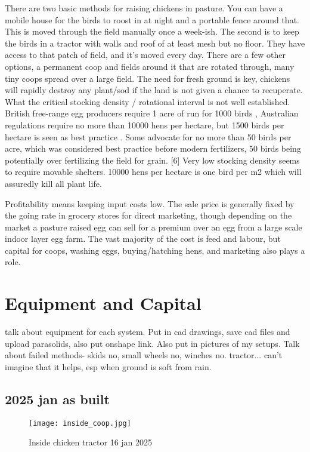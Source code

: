 \documentclass [11pt]{article}
\begin{document}
There are two basic methods for raising chickens in pasture.\cite{clancy2006} You can have a mobile house for the birds to roost in at night and a portable fence around that. This is moved through the field manually once a week-ish. The second is to keep the birds in a tractor with walls and roof of at least mesh but no floor. They have access to that patch of field, and it's moved every day. There are a few other options, a permanent coop and fields around it that are rotated through, many tiny coops spread over a large field. The need for fresh ground is key, chickens will rapidly destroy any plant/sod if the land is not given a chance to recuperate. What the critical stocking density / rotational interval is not well established. British free-range egg producers require 1 acre of run for 1000 birds \cite{britishFreeRangEegg}, Australian regulations require no more than 10000 hens per hectare, but 1500 birds per hectare is seen as best practice \cite{animalsAustralia}. Some advocate for no more than 50 birds per acre, which was considered best practice before modern fertilizers, 50 birds being potentially over fertilizing the field for grain. [6] Very low stocking density seems to require movable shelters. 10000 hens per hectare is one bird per m2 which will assuredly kill all plant life. 

Profitability means keeping input costs low. The sale price is generally fixed by the going rate in grocery stores for direct marketing, though depending on the market a pasture raised egg can sell for a premium over an egg from a large scale indoor layer egg farm. The vast majority of the cost is feed and labour, but capital for coops, washing eggs, buying/hatching hens, and marketing also plays a role.


\section{Equipment and Capital}
talk about equipment for each system. Put in cad drawings, save cad files and upload parasolids, also put onshape link. Also put in pictures of my setups. Talk about failed methods- skids no, small wheels no, winches no. tractor... can't imagine that it helps, esp when ground is soft from rain. 
\subsection{2025 jan as built}
\begin{figure}
    \centering
    \texttt{[image: inside\_coop.jpg]}
    \caption{Inside chicken tractor 16 jan 2025}
    \label{fig:enter-label}
\end{figure}
\end{document}
